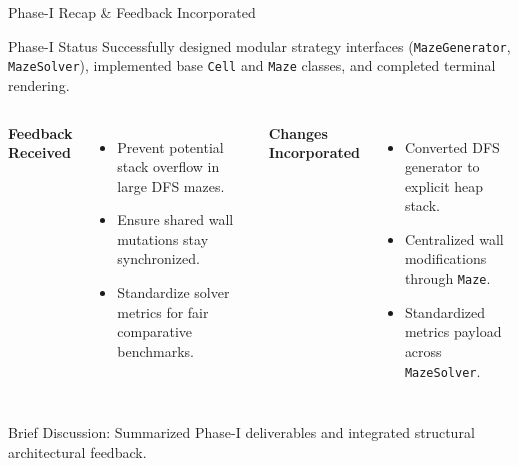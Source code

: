 \documentclass[aspectratio=169,11pt]{beamer}
\newcommand{\smallnote}[1]{%
\vspace{0.08cm}
{\scriptsize\color{GEUGrey}#1}
}
\begin{document}
\begin{frame}{Phase-I Recap \& Feedback Incorporated}

\begin{block}{Phase-I Status}
Successfully designed modular strategy interfaces (\texttt{MazeGenerator}, \texttt{MazeSolver}), implemented base \texttt{Cell} and \texttt{Maze} classes, and completed terminal rendering.
\end{block}

\vspace{2mm}

\begin{columns}[T,totalwidth=\textwidth]


\textbf{\color{GEUBlue}Feedback Received}

\begin{itemize}\itemsep2pt
\item Prevent potential stack overflow in large DFS mazes.
\item Ensure shared wall mutations stay synchronized.
\item Standardize solver metrics for fair comparative benchmarks.
\end{itemize}


\textbf{\color{GEUBlue}Changes Incorporated}

\begin{itemize}\itemsep2pt
\item Converted DFS generator to explicit heap stack.
\item Centralized wall modifications through \texttt{Maze}.
\item Standardized metrics payload across \texttt{MazeSolver}.
\end{itemize}

\end{columns}

\vfill

\smallnote{
Brief Discussion: Summarized Phase-I deliverables and integrated structural architectural feedback.
}

\end{frame}
\end{document}
